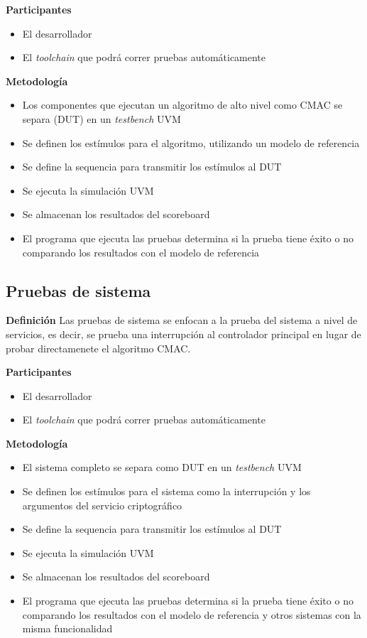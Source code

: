 \documentclass[a4paper]{article}
\begin{document}
\noindent\textbf{Participantes}

\begin{itemize}
  \item El desarrollador
  \item El \textit{toolchain} que podrá correr pruebas automáticamente
\end{itemize}

\noindent\textbf{Metodología}


\begin{itemize}
  \item Los componentes que ejecutan un algoritmo de alto nivel como CMAC se separa (DUT) en un \textit{testbench} UVM
  \item Se definen los estímulos para el algoritmo, utilizando un modelo de referencia
  \item Se define la sequencia para transmitir los estímulos al DUT
  \item Se ejecuta la simulación UVM
  \item Se almacenan los resultados del scoreboard
  \item El programa que ejecuta las pruebas determina si la prueba tiene éxito o no comparando los resultados con el modelo de referencia
\end{itemize}

\subsection{Pruebas de sistema}

\noindent\textbf{Definición}
Las pruebas de sistema se enfocan a la prueba del sistema a nivel de servicios, es decir, se prueba una interrupción al controlador principal en lugar de probar directamenete el algoritmo CMAC.

\noindent\textbf{Participantes}

\begin{itemize}
  \item El desarrollador
  \item El \textit{toolchain} que podrá correr pruebas automáticamente
\end{itemize}

\noindent\textbf{Metodología}


\begin{itemize}
  \item El sistema completo se separa como DUT en un \textit{testbench} UVM
  \item Se definen los estímulos para el sistema como la interrupción y los argumentos del servicio criptográfico
  \item Se define la sequencia para transmitir los estímulos al DUT
  \item Se ejecuta la simulación UVM
  \item Se almacenan los resultados del scoreboard
  \item El programa que ejecuta las pruebas determina si la prueba tiene éxito o no comparando los resultados con el modelo de referencia y otros sistemas con la misma funcionalidad
\end{itemize}
\end{document}
